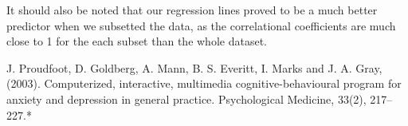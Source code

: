 \documentclass{article}
\begin{document}
It should also be noted that our regression lines proved to be a much better predictor when we subsetted the data, as the correlational coefficients are much close to 1 for the each subset than the whole dataset.


\begin{thebibliography}{1}
J. Proudfoot, D. Goldberg, A. Mann, B. S. Everitt, I. Marks and J. A. Gray, (2003). Computerized, interactive, multimedia cognitive-behavioural program for anxiety and depression in general practice. Psychological Medicine, 33(2), 217–227.*
\end{thebibliography}
\end{document}
